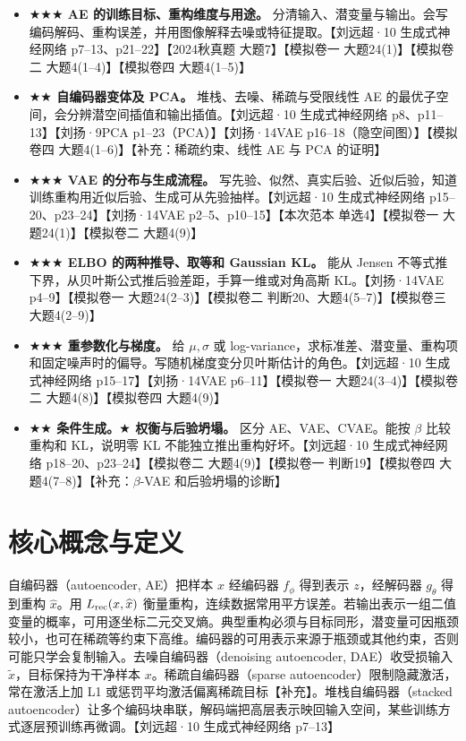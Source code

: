 \documentclass[UTF8,a4paper,zihao=-4,fontset=fandol]{ctexrep}
\begin{document}
\begin{itemize}
\item \textbf{\(\bigstar\bigstar\bigstar\) AE 的训练目标、重构维度与用途。} 分清输入、潜变量与输出。会写编码解码、重构误差，并用图像解释去噪或特征提取。【刘远超·10 生成式神经网络 p7--13、p21--22】【2024秋真题 大题7】【模拟卷一 大题24(1)】【模拟卷二 大题4(1--4)】【模拟卷四 大题4(1--5)】
\item \textbf{\(\bigstar\bigstar\) 自编码器变体及 PCA。} 堆栈、去噪、稀疏与受限线性 AE 的最优子空间，会分辨潜空间插值和输出插值。【刘远超·10 生成式神经网络 p8、p11--13】【刘扬·9PCA p1--23（PCA）】【刘扬·14VAE p16--18（隐空间图）】【模拟卷四 大题4(1--6)】【补充：稀疏约束、线性 AE 与 PCA 的证明】
\item \textbf{\(\bigstar\bigstar\bigstar\) VAE 的分布与生成流程。} 写先验、似然、真实后验、近似后验，知道训练重构用近似后验、生成可从先验抽样。【刘远超·10 生成式神经网络 p15--20、p23--24】【刘扬·14VAE p2--5、p10--15】【本次范本 单选4】【模拟卷一 大题24(1)】【模拟卷二 大题4(9)】
\item \textbf{\(\bigstar\bigstar\bigstar\) ELBO 的两种推导、取等和 Gaussian KL。} 能从 Jensen 不等式推下界，从贝叶斯公式推后验差距，手算一维或对角高斯 KL。【刘扬·14VAE p4--9】【模拟卷一 大题24(2--3)】【模拟卷二 判断20、大题4(5--7)】【模拟卷三 大题4(2--9)】
\item \textbf{\(\bigstar\bigstar\bigstar\) 重参数化与梯度。} 给 $\mu,\sigma$ 或 log-variance，求标准差、潜变量、重构项和固定噪声时的偏导。写随机梯度变分贝叶斯估计的角色。【刘远超·10 生成式神经网络 p15--17】【刘扬·14VAE p6--11】【模拟卷一 大题24(3--4)】【模拟卷二 大题4(8)】【模拟卷四 大题4(9)】
\item \textbf{\(\bigstar\bigstar\) 条件生成。\(\bigstar\) 权衡与后验坍塌。} 区分 AE、VAE、CVAE。能按 $\beta$ 比较重构和 KL，说明零 KL 不能独立推出重构好坏。【刘远超·10 生成式神经网络 p18--20、p23--24】【模拟卷二 大题4(9)】【模拟卷一 判断19】【模拟卷四 大题4(7--8)】【补充：$\beta$-VAE 和后验坍塌的诊断】
\end{itemize}

\section{核心概念与定义}

自编码器（autoencoder, AE）把样本 $x$ 经编码器 $f_\phi$ 得到表示 $z$，经解码器 $g_\theta$ 得到重构 $\widehat x$。用 $L_{\rm rec}(x,\widehat x)$ 衡量重构，连续数据常用平方误差。若输出表示一组二值变量的概率，可用逐坐标二元交叉熵。典型重构必须与目标同形，潜变量可因瓶颈较小，也可在稀疏等约束下高维。编码器的可用表示来源于瓶颈或其他约束，否则可能只学会复制输入。去噪自编码器（denoising autoencoder, DAE）收受损输入 $\widetilde x$，目标保持为干净样本 $x$。稀疏自编码器（sparse autoencoder）限制隐藏激活，常在激活上加 L1 或惩罚平均激活偏离稀疏目标【补充】。堆栈自编码器（stacked autoencoder）让多个编码块串联，解码端把高层表示映回输入空间，某些训练方式逐层预训练再微调。【刘远超·10 生成式神经网络 p7--13】
\end{document}

